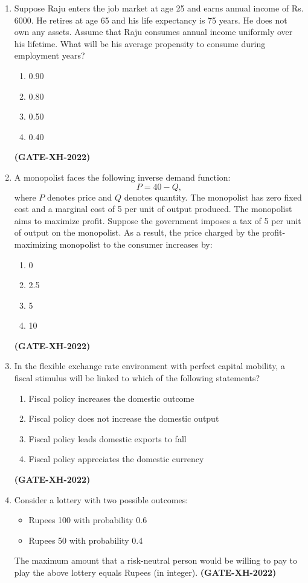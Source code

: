 \documentclass[journal]{IEEEtran}
\begin{document}
\begin{enumerate}
\item Suppose Raju enters the job market at age 25 and earns annual income of Rs. 6000. He retires at age 65 and his life expectancy is 75 years. He does not own any assets. Assume that Raju consumes annual income uniformly over his lifetime. What will be his average propensity to consume during employment years?
\begin{multicols}{4}
\begin{enumerate}
\item 0.90
\item 0.80
\item 0.50
\item 0.40
\end{enumerate}
\end{multicols}
\hfill\textbf{(GATE-XH-2022)}
\item A monopolist faces the following inverse demand function:
\[
P = 40 - Q,
\]
where $P$ denotes price and $Q$ denotes quantity. The monopolist has zero fixed cost and a marginal cost of 5 per unit of output produced. The monopolist aims to maximize profit. Suppose the government imposes a tax of 5 per unit of output on the monopolist. As a result, the price charged by the profit-maximizing monopolist to the consumer increases by:
\begin{multicols}{4}
\begin{enumerate}
\item 0
\item 2.5
\item 5
\item 10
\end{enumerate}
\end{multicols}
\hfill\textbf{(GATE-XH-2022)}

\item In the flexible exchange rate environment with perfect capital mobility, a fiscal stimulus will be linked to which of the following statements?
\begin{enumerate}
\item Fiscal policy increases the domestic outcome
\item Fiscal policy does not increase the domestic output
\item Fiscal policy leads domestic exports to fall
\item Fiscal policy appreciates the domestic currency
\end{enumerate}
\hfill\textbf{(GATE-XH-2022)}

\item Consider a lottery with two possible outcomes:
\begin{itemize}
    \item Rupees 100 with probability 0.6  
    \item  Rupees 50 with probability 0.4  
\end{itemize}    
The maximum amount that a risk-neutral person would be willing to pay to play the above lottery equals Rupees \underline{\hspace{2cm}} (in integer).
\hfill\textbf{(GATE-XH-2022)}
\vspace{0.2cm}


\end{enumerate}
\end{document}
